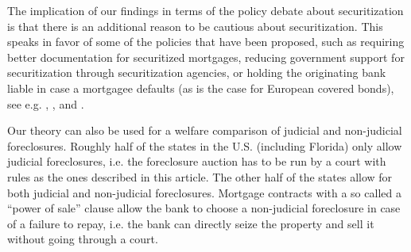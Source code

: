 \documentclass[11pt,twopage]{article}
\begin{document}
The implication of our findings in terms of the policy debate about securitization is that there is an additional reason to be cautious about securitization. This speaks in favor of some of the policies that have been proposed, such as requiring better documentation for securitized mortgages, reducing government support for securitization through securitization agencies, or holding the originating bank liable in case a mortgagee defaults (as is the case for European covered bonds), see e.g. \cite{keys2008did}, \cite{tirole2011illiquidity}, and \cite{campbell2013mortgage}.

%
%
%
%

Our theory can also be used for a welfare comparison of judicial and non-judicial foreclosures. 
Roughly half of the states in the
U.S. (including Florida) only allow judicial foreclosures, i.e. the
foreclosure auction has to be run by a court with rules as the ones
described in this article. The other half of the states allow for both
judicial and non-judicial foreclosures.  Mortgage contracts
with a so called a ``power of sale'' clause allow the bank to choose a non-judicial
foreclosure in case of a failure to repay, i.e. the bank can directly
seize the property and sell it without going through a court. 
\end{document}
